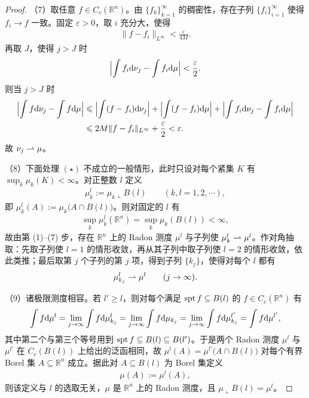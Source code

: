 \documentclass[../../main.tex]{subfiles}%
\begin{document}
\begin{proof}
（7）取任意 $f\in C_c(\mathbb{R}^n)$。由 $\{f_k\}_{k=1}^{\infty}$ 的稠密性，存在子列 $\{f_{i}\}_{i=1}^{\infty}$ 使得 $f_i\to f$ 一致。固定 $\varepsilon>0$，取 $i$ 充分大，使得
\begin{align*}
\lVert f-f_i\rVert_{L^\infty}<\frac{\varepsilon}{4M}.
\end{align*}
再取 $J$，使得 $j>J$ 时
\begin{align*}
\Bigl\lvert\int f_i\mathrm{d}\nu_j-\int f_i\mathrm{d}\mu\Bigr\rvert<\frac{\varepsilon}{2}.
\end{align*}
则当 $j>J$ 时
\begin{align*}
\Bigl\lvert\int f\mathrm{d}\nu_j-\int f\mathrm{d}\mu\Bigr\rvert
&\leqslant\Bigl\lvert\int(f-f_i)\mathrm{d}\nu_j\Bigr\rvert+\Bigl\lvert\int(f-f_i)\mathrm{d}\mu\Bigr\rvert+\Bigl\lvert\int f_i\mathrm{d}\nu_j-\int f_i\mathrm{d}\mu\Bigr\rvert\\
&\leqslant2M\lVert f-f_i\rVert_{L^\infty}+\frac{\varepsilon}{2}<\varepsilon .
\end{align*}
故 $\nu_j\rightharpoonup\mu$。

（8）下面处理 $(\star)$ 不成立的一般情形，此时只设对每个紧集 $K$ 有 $\sup_k\mu_k(K)<\infty$。对正整数 $l$ 定义
\begin{align*}
\mu_k^l:=\mu_k\llcorner B(l)\qquad(k,l=1,2,\cdots),
\end{align*}
即 $\mu_k^l(A):=\mu_k\bigl(A\cap B(l)\bigr)$。则对固定的 $l$ 有
\begin{align*}
\sup_k\mu_k^l(\mathbb{R}^n)=\sup_k\mu_k(B(l))<\infty,
\end{align*}
故由第 (1)–(7) 步，存在 $\mathbb{R}^n$ 上的 Radon 测度 $\mu^l$ 与子列使 $\mu_k^l\rightharpoonup\mu^l$。作对角抽取：先取子列使 $l=1$ 的情形收敛，再从其子列中取子列使 $l=2$ 的情形收敛，依此类推；最后取第 $j$ 个子列的第 $j$ 项，得到子列 $\{k_j\}$，使得对每个 $l$ 都有
\begin{align*}
\mu_{k_j}^l\rightharpoonup\mu^l\qquad(j\to\infty).
\end{align*}

（9）诸极限测度相容。若 $l'\geqslant l$，则对每个满足 $\operatorname{spt} f\subseteq B(l)$ 的 $f\in C_c(\mathbb{R}^n)$ 有
\begin{align*}
\int f\mathrm{d}\mu^l=\lim_{j\to\infty}\int f\mathrm{d}\mu_{k_j}^l=\lim_{j\to\infty}\int f\mathrm{d}\mu_{k_j}=\lim_{j\to\infty}\int f\mathrm{d}\mu_{k_j}^{l'}=\int f\mathrm{d}\mu^{l'},
\end{align*}
其中第二个与第三个等号用到 $\operatorname{spt} f\subseteq B(l)\subseteq B(l')$。于是两个 Radon 测度 $\mu^l$ 与 $\mu^{l'}$ 在 $C_c(B(l))$ 上给出的泛函相同，故 $\mu^l(A)=\mu^{l'}\bigl(A\cap B(l)\bigr)$ 对每个有界 Borel 集 $A\subseteq\mathbb{R}^n$ 成立。据此对 $A\subseteq B(l)$ 为 Borel 集定义
\begin{align*}
\mu(A):=\mu^l(A),
\end{align*}
则该定义与 $l$ 的选取无关，$\mu$ 是 $\mathbb{R}^n$ 上的 Radon 测度，且 $\mu\llcorner B(l)=\mu^l$。


\end{proof}
\end{document}
